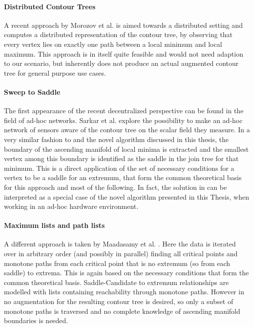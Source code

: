 \documentclass[%
	paper=A4,					%
	twoside=true,				%
	openright,					%
	parskip=full,				%
	chapterprefix=true,			%
	11pt,						%
	headings=normal,			%
	bibliography=totoc,			%
	listof=totoc,				%
	titlepage=on,				%
	captions=tableabove,		%
	draft=false,				%
]{scrreprt}%
\begin{document}
\paragraph{Distributed Contour Trees}
A recent approach by Morozov et al. \cite{Morozov} is aimed towards a distributed setting and computes a distributed representation of the contour tree, by observing that every vertex lies on exactly one path between a local minimum and local maximum. This approach is in itself quite feasible and would not need adaption to our scenario, but inherently does not produce an actual augmented contour tree for general purpose use cases.

\paragraph{Sweep to Saddle}
The first appearance of the recent decentralized perspective \cite{base} can be found in the field of ad-hoc networks. Sarkar et al. \cite{adhoc} explore the possibility to make an ad-hoc network of sensors aware of the contour tree on the scalar field they measure. In a very similar fashion to \cite{Carr} and the novel algorithm discussed in this thesis, the boundary of the ascending manifold of local minima is extracted and the smallest vertex among this boundary is identified as the saddle in the join tree for that minimum. This is a direct application of the set of necessary conditions for a vertex to be a saddle for an extremum, that form the common theoretical basis for this approach and most of the following. In fact, the solution in \cite{adhoc} can be interpreted as a special case of the novel algorithm presented in this Thesis, when working in an ad-hoc hardware environment.

\paragraph{Maximum lists and path lists}
A different approach is taken by Maadasamy et al. \cite{Maadasamy}. Here the data is iterated over in arbitrary order (and possibly in parallel) finding all critical points and monotone paths from each critical point that is no extremum (so from each saddle) to extrema. This is again based on the necessary conditions that form the common theoretical basis. Saddle-Candidate to extremum relationships are modelled with lists containing reachability through monotone paths. However in \cite{Maadasamy} no augmentation for the resulting contour tree is desired, so only a subset of monotone paths is traversed and no complete knowledge of ascending manifold boundaries is needed.
\end{document}
